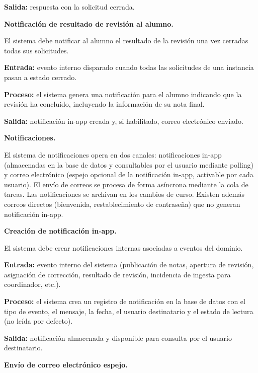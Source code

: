 \begin{functional}
\begin{functional}
    \textbf{Salida:} respuesta con la solicitud cerrada.

    \item \textbf{Notificación de resultado de revisión al alumno.}

    El sistema debe notificar al alumno el resultado de la revisión una vez cerradas todas sus solicitudes.

    \textbf{Entrada:} evento interno disparado cuando todas las solicitudes de una instancia pasan a estado cerrado.

    \textbf{Proceso:} el sistema genera una notificación para el alumno indicando que la revisión ha concluido, incluyendo la información de su nota final.

    \textbf{Salida:} notificación in-app creada y, si habilitado, correo electrónico enviado.

  \end{functional}

  \item \textbf{Notificaciones.}

  El sistema de notificaciones opera en dos canales: notificaciones in-app (almacenadas en la base de datos y consultables por el usuario mediante polling) y correo electrónico (espejo opcional de la notificación in-app, activable por cada usuario). El envío de correos se procesa de forma asíncrona mediante la cola de tareas. Las notificaciones se archivan en los cambios de curso. Existen además correos directos (bienvenida, restablecimiento de contraseña) que no generan notificación in-app.

  \begin{functional}
    \item \textbf{Creación de notificación in-app.}

    El sistema debe crear notificaciones internas asociadas a eventos del dominio.

    \textbf{Entrada:} evento interno del sistema (publicación de notas, apertura de revisión, asignación de corrección, resultado de revisión, incidencia de ingesta para coordinador, etc.).

    \textbf{Proceso:} el sistema crea un registro de notificación en la base de datos con el tipo de evento, el mensaje, la fecha, el usuario destinatario y el estado de lectura (no leída por defecto).

    \textbf{Salida:} notificación almacenada y disponible para consulta por el usuario destinatario.

    \item \textbf{Envío de correo electrónico espejo.}


\end{functional}
\end{functional}
